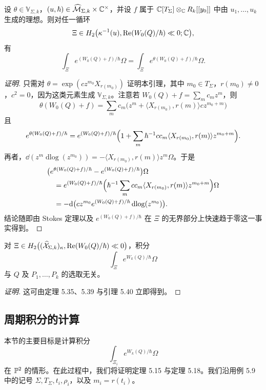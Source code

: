\begin{lemma}
  设 $\theta\in\mathbb{V}_{\Sigma,k}$，$(u,\hbar)\in\widehat{\mathcal{M}}_{\Sigma,k}\times\mathbb{C}^\times$，并设 $f$ 属于 $\mathbb{C}[T_\Sigma]\otimes_{\mathbb{C}} R_k[[y_0]]$ 中由 $u_1,\ldots,u_k$ 生成的理想。则对任一循环
  \[
    \Xi\in H_2\bigl(\kappa^{-1}(u),\operatorname{Re}(W_0(Q)/\hbar)\ll 0;\mathbb{C}\bigr),
  \]
  有
  \[
    \int_\Xi e^{(W_0(Q)+f)/\hbar}\Omega=\int_\Xi e^{\theta(W_0(Q)+f)/\hbar}\Omega.
  \]
\end{lemma}

\begin{proof}[证明]
只需对 $\theta=\exp(cz^{m_0}X_{r(m_0)})$ 证明本引理，其中 $m_0\in T_\Sigma$，$r(m_0)\ne 0$，$c^2=0$，因为这类元素生成 $\mathbb{V}_{\Sigma,k}$。注意若 $W_0(Q)+f=\sum_m c_mz^m$，则
\[
  \theta(W_0(Q)+f)=\sum_m c_m\bigl(z^m+\langle X_{r(m_0)},r(m)\rangle cz^{m_0+m}\bigr)
\]
且
\[
  e^{\theta(W_0(Q)+f)/\hbar}=e^{(W_0(Q)+f)/\hbar}\Bigl(1+\sum_m \hbar^{-1}cc_m\langle X_{r(m_0)},r(m)\rangle z^{m_0+m}\Bigr).
\]
再者，$\dd(z^m\operatorname{dlog}(z^{m_0}))=-\langle X_{r(m_0)},r(m)\rangle z^m\Omega$。于是
\begin{align*}
  &\bigl(e^{\theta(W_0(Q)+f)/\hbar}-e^{(W_0(Q)+f)/\hbar}\bigr)\Omega\\
  &\quad = e^{(W_0(Q)+f)/\hbar}\Bigl(\hbar^{-1}\sum_m cc_m\langle X_{r(m_0)},r(m)\rangle z^{m_0+m}\Bigr)\Omega\\
  &\quad = -\mathrm{d}\bigl(cz^{m_0}e^{(W_0(Q)+f)/\hbar}\operatorname{dlog}(z^{m_0})\bigr).
\end{align*}
结论随即由 Stokes 定理以及 $e^{(W_0(Q)+f)/\hbar}$ 在 $\Xi$ 的无界部分上快速趋于零这一事实得到。
\end{proof}

\begin{lemma}
  对 $\Xi\in H_2\bigl((\widehat{\mathcal{X}}_{\Sigma,k})_\kappa,\operatorname{Re}(W_0(Q)/\hbar)\ll 0\bigr)$，积分
  \[
    \int_\Xi e^{W_k(Q)/\hbar}\Omega
  \]
  与 $Q$ 及 $P_1,\ldots,P_k$ 的选取无关。
\end{lemma}

\begin{proof}[证明]
这可由定理 5.35、5.39 与引理 5.40 立即得到。
\end{proof}

\subsection{周期积分的计算}

本节的主要目标是计算积分
\begin{equation}
  \int_{\Xi_i} e^{W_k(Q)/\hbar}\Omega \tag{5.21}
\end{equation}
在 $\mathbb{P}^2$ 的情形。在此过程中，我们将证明定理 5.15 与定理 5.18。我们沿用例 5.9 中的记号 $\Sigma,T_\Sigma,t_i,\rho_i$，以及 $m_i=r(t_i)$。

